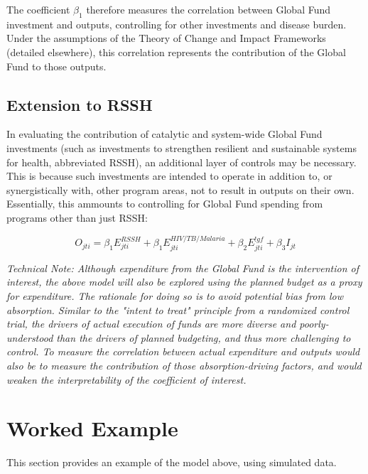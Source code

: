 \documentclass[twocolumn]{bmcart}%
\begin{document}
The coefficient $\beta_1$ therefore measures the correlation between Global Fund investment and outputs, controlling for other investments and disease burden. Under the assumptions of the Theory of Change and Impact Frameworks (detailed elsewhere), this correlation represents the contribution of the Global Fund to those outputs. \\

\subsection{Extension to RSSH}
In evaluating the contribution of catalytic and system-wide Global Fund investments (such as investments to strengthen resilient and sustainable systems for health, abbreviated RSSH), an additional layer of controls may be necessary. This is because such investments are intended to operate in addition to, or synergistically with, other program areas, not to result in outputs on their own. Essentially, this ammounts to controlling for Global Fund spending from programs other than just RSSH:

\begin{equation}
O_{jti} = \beta_1 E^{RSSH}_{jti} + \beta_1 E^{HIV/TB/Malaria}_{jti} + \beta_2 E^{!gf}_{jti} + \beta_3 I_{jt}
\end{equation}

\textit{Technical Note: Although expenditure from the Global Fund is the intervention of interest, the above model will also be explored using the planned budget as a proxy for expenditure. The rationale for doing so is to avoid potential bias from low absorption. Similar to the "intent to treat" principle from a randomized control trial, the drivers of actual execution of funds are more diverse and poorly-understood than the drivers of planned budgeting, and thus more challenging to control. To measure the correlation between actual expenditure and outputs would also be to measure the contribution of those absorption-driving factors, and would weaken the interpretability of the coefficient of interest. \\}

\section{Worked Example}
This section provides an example of the model above, using simulated data.
\end{document}
